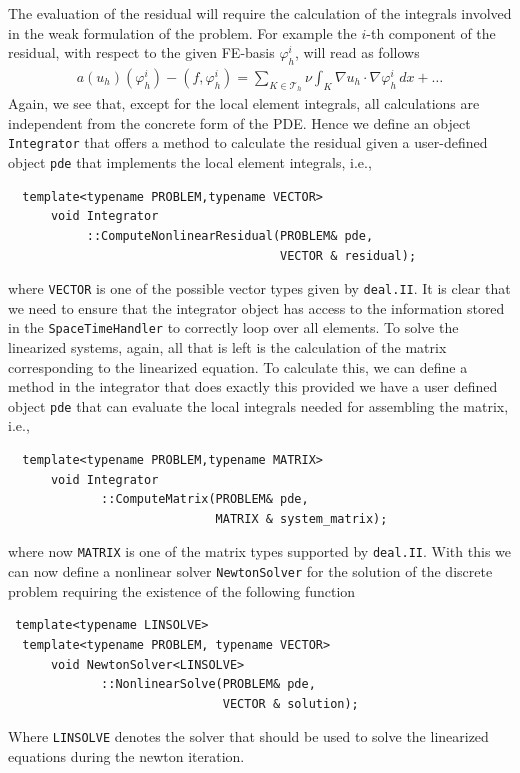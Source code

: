 \documentclass[smallextended]{svjour3}       %
\numberwithin{equation}{section}
\renewcommand{\phi}{\varphi}
\newcommand{\deal}{\texttt{deal.II}}
\begin{document}
The evaluation of the residual will require the calculation of the integrals 
involved in the weak formulation of the problem. For example 
the $i$-th component of the residual, with respect to the given FE-basis 
$\phi_{h}^{i}$, will read as follows
\begin{align}\label{eq:residual_vector}
 a(u_h)(\phi_{h}^{i}) - (f,\phi_{h}^{i}) = \sum_{K\in \mathcal T_h} \nu\int_K \nabla u_h\cdot \nabla \phi_{h}^{i}\,dx + \ldots
 \end{align}
Again, we see that, except for the local element integrals, all 
calculations are independent from the concrete form of the PDE. 
Hence we define an object \texttt{Integrator}
that offers a method to calculate the residual given a user-defined 
object \texttt{pde} that implements the local element integrals, i.e.,
\begin{lstlisting}
  template<typename PROBLEM,typename VECTOR>
      void Integrator
           ::ComputeNonlinearResidual(PROBLEM& pde, 
                                      VECTOR & residual);
\end{lstlisting}
where \texttt{VECTOR} is one of the possible vector types given by \deal{}.
It is clear that we need to ensure that the integrator object has access
to the information stored in the \texttt{SpaceTimeHandler}
to correctly loop over all elements.
To solve the linearized systems, again, all that is left is the calculation
of the matrix corresponding to the linearized equation. To calculate this,
 we can define a method in the integrator that does exactly this provided
we have a user defined object \texttt{pde} that can evaluate the local 
integrals needed for assembling the matrix, i.e.,
\begin{lstlisting}
  template<typename PROBLEM,typename MATRIX>
      void Integrator
             ::ComputeMatrix(PROBLEM& pde, 
                             MATRIX & system_matrix);
\end{lstlisting}
where now \texttt{MATRIX} is one of the matrix types supported by \deal{}.
With this we can now define a nonlinear solver \texttt{NewtonSolver} 
for the solution of the discrete problem requiring the existence of the 
following function
\begin{lstlisting}
 template<typename LINSOLVE>
  template<typename PROBLEM, typename VECTOR>
      void NewtonSolver<LINSOLVE>
             ::NonlinearSolve(PROBLEM& pde, 
                              VECTOR & solution);
\end{lstlisting}
Where \texttt{LINSOLVE} denotes the solver that should be used to solve the 
linearized equations during the newton iteration.
\end{document}
